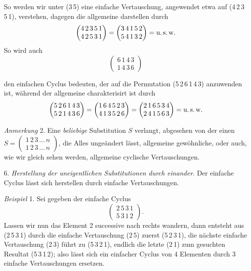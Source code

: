 \documentclass[11pt]{article}
\providecommand{\weberpage}[1]{}
\begin{document}
So werden wir unter (3\,5) eine einfache Vertauschung, angewendet etwa
auf (4\,2\,3\,5\,1), verstehen, dagegen die allgemeine darstellen durch
\[
\begin{pmatrix}4\,2\,3\,5\,1\\4\,2\,5\,3\,1\end{pmatrix}=
\begin{pmatrix}3\,4\,1\,5\,2\\5\,4\,1\,3\,2\end{pmatrix}=\text{u.\,s.\,w.}
\]
So wird auch
\[
\begin{pmatrix}6\,1\,4\,3\\1\,4\,3\,6\end{pmatrix}
\]


\weberpage{7}
den einfachen Cyclus bedeuten, der auf die Permutation (5\,2\,6\,1\,4\,3)
anzuwenden ist, während der allgemeine charakterisirt ist durch
\[
\begin{pmatrix}5\,2\,6\,1\,4\,3\\5\,2\,1\,4\,3\,6\end{pmatrix}=
\begin{pmatrix}1\,6\,4\,5\,2\,3\\4\,1\,3\,5\,2\,6\end{pmatrix}=
\begin{pmatrix}2\,1\,6\,5\,3\,4\\2\,4\,1\,5\,6\,3\end{pmatrix}=\text{u.\,s.\,w.}
\]

\textit{Anmerkung} 2. Eine \textit{beliebige} Substitution $S$ verlangt,
abgesehen von der einen
$S=\begin{pmatrix}1\,2\,3\,\dots\,n\\1\,2\,3\,\dots\,n\end{pmatrix}$,
die Alles ungeändert lässt, allgemeine gewöhnliche, oder auch, wie wir
gleich sehen werden, allgemeine cyclische Vertauschungen.

6. \textit{Herstellung der uneigentlichen Substitutionen durch
einander}. Der einfache Cyclus lässt sich herstellen durch einfache
Vertauschungen.

\textit{Beispiel} 1. Sei gegeben der einfache Cyclus
\[
\begin{pmatrix}2\,5\,3\,1\\5\,3\,1\,2\end{pmatrix}.
\]
Lassen wir nun das Element 2 successive nach rechts wandern, dann
entsteht aus (2\,5\,3\,1) durch die einfache Vertauschung (2\,5) zuerst
(5\,2\,3\,1), die nächste einfache Vertauschung (2\,3) führt zu
(5\,3\,2\,1), endlich die letzte (2\,1) zum gesuchten Resultat
(5\,3\,1\,2); also lässt sich ein einfacher Cyclus von 4 Elementen durch
3 einfache Vertauschungen ersetzen.
\end{document}

